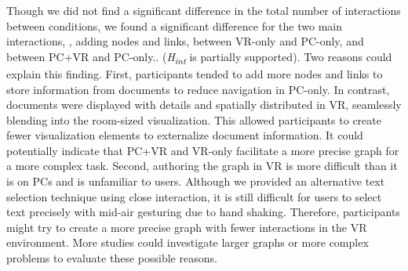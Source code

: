 Though we did not find a significant difference in the total number of interactions between conditions, we found a significant difference for the two main interactions, \ie{}, adding nodes and links, between VR-only and PC-only, and between PC+VR and PC-only.. (\textit{H\textsubscript{int}} is partially supported).
Two reasons could explain this finding. 
First, participants tended to add more nodes and links to store information from documents to reduce navigation in PC-only.
 In contrast, documents were displayed with details and spatially distributed in VR, seamlessly blending into the room-sized visualization. This allowed participants to create fewer visualization elements to externalize document information. It could potentially indicate that PC+VR and VR-only facilitate a more precise graph for a more complex task.
Second, authoring the graph in VR is more difficult than it is on PCs and is unfamiliar to users. Although we provided an alternative text selection technique using close interaction, it is still difficult for users to select text precisely with mid-air gesturing due to hand shaking. Therefore, participants might try to create a more precise graph with fewer interactions in the VR environment.
More studies could investigate larger graphs or more complex problems to evaluate these possible reasons.


